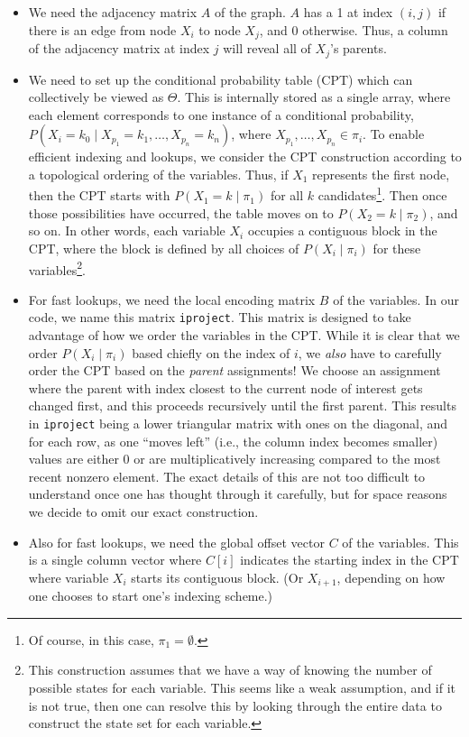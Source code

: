 \documentclass{article} %
\begin{document}
\begin{itemize}
    \item We need the adjacency matrix $A$ of the graph. $A$ has a 1 at index $(i,j)$ if there is an
    edge from node $X_i$ to node $X_j$, and 0 otherwise. Thus, a column of the adjacency matrix at
    index $j$ will reveal all of $X_j$'s parents.
    \item We need to set up the conditional probability table (CPT) which can collectively be viewed
    as $\Theta$. This is internally stored as a single array, where each element corresponds to one
    instance of a conditional probability, $P(X_i = k_0 \mid X_{p_1} = k_1, \ldots, X_{p_n} = k_n)$,
    where $X_{p_1}, \ldots, X_{p_n} \in \pi_i$. To enable efficient indexing and lookups, we
    consider the CPT construction according to a topological ordering of the variables. Thus, if
    $X_1$ represents the first node, then the CPT starts with $P(X_1 = k \mid \pi_1)$ for all $k$
    candidates\footnote{Of course, in this case, $\pi_1 = \emptyset$.}. Then once those
    possibilities have occurred, the table moves on to $P(X_2 = k \mid \pi_2)$, and so on. In other
    words, each variable $X_i$ occupies a contiguous block in the CPT, where the block is defined by
    all choices of $P(X_i \mid \pi_i)$ for these variables\footnote{This construction assumes that
    we have a way of knowing the number of possible states for each variable. This seems like a weak
    assumption, and if it is not true, then one can resolve this by looking through the entire data
    to construct the state set for each variable.}.
    \item For fast lookups, we need the local encoding matrix $B$ of the variables. In our code, we
    name this matrix \texttt{iproject}. This matrix is designed to take advantage of how we order
    the variables in the CPT. While it is clear that we order $P(X_i\mid \pi_i)$ based chiefly on
    the index of $i$, we \emph{also} have to carefully order the CPT based on the \emph{parent}
    assignments! We choose an assignment where the parent with index closest to the current node of
    interest gets changed first, and this proceeds recursively until the first parent. This results
    in \texttt{iproject} being a lower triangular matrix with ones on the diagonal, and for each
    row, as one ``moves left'' (i.e., the column index becomes smaller) values are either 0 or are
    multiplicatively increasing compared to the most recent nonzero element. The exact details of
    this are not too difficult to understand once one has thought through it carefully, but for
    space reasons we decide to omit our exact construction.
    \item Also for fast lookups, we need the global offset vector $C$ of the variables. This is a
    single column vector where $C[i]$ indicates the starting index in the CPT where variable
    $X_i$ starts its contiguous block. (Or $X_{i+1}$, depending on how one chooses to start one's
    indexing scheme.)
\end{itemize}
\end{document}
